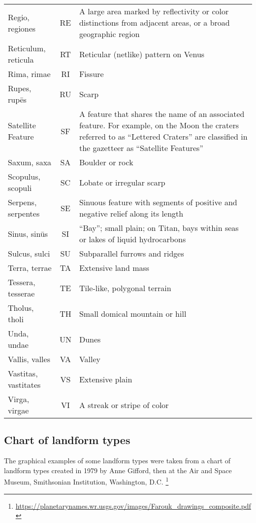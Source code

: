 \begin{longtable}{l|c|p{72mm}}
Regio, regiones       & RE & A large area marked by reflectivity or color distinctions from adjacent areas, 
                             or a broad geographic region\\%
Reticulum, reticula   & RT & Reticular (netlike) pattern on Venus\\%
Rima, rimae           & RI & Fissure\\%
Rupes, rupēs          & RU & Scarp\\\midrule
Satellite Feature     & SF & A feature that shares the name of an associated feature. 
                             For example, on the Moon the craters referred to as ``Lettered Craters'' 
							 are classified in the gazetteer as ``Satellite Features''\\%
Saxum, saxa           & SA & Boulder or rock\\%
Scopulus, scopuli     & SC & Lobate or irregular scarp\\%
Serpens, serpentes    & SE & Sinuous feature with segments of positive and negative relief along its length\\%
Sinus, sinūs          & SI & ``Bay''; small plain; on Titan, bays within seas or lakes of liquid hydrocarbons\\%
Sulcus, sulci         & SU & Subparallel furrows and ridges\\\midrule
Terra, terrae         & TA & Extensive land mass\\%
Tessera, tesserae     & TE & Tile-like, polygonal terrain\\%
Tholus, tholi         & TH & Small domical mountain or hill\\\midrule
Unda, undae           & UN & Dunes\\\midrule
Vallis, valles        & VA & Valley\\%
Vastitas, vastitates  & VS & Extensive plain\\%
Virga, virgae         & VI & A streak or stripe of color\\\bottomrule
\end{longtable}

\subsection{Chart of landform types}
\label{sec:Nomenclature:DescriptorTerms:Chart}

The graphical examples of some landform types were taken from a 
chart of landform types created in 1979 by Anne Gifford, then at the Air and Space Museum, Smithsonian Institution, Washington, D.C.
\footnote{\url{https://planetarynames.wr.usgs.gov/images/Farouk_drawings_composite.pdf}}

